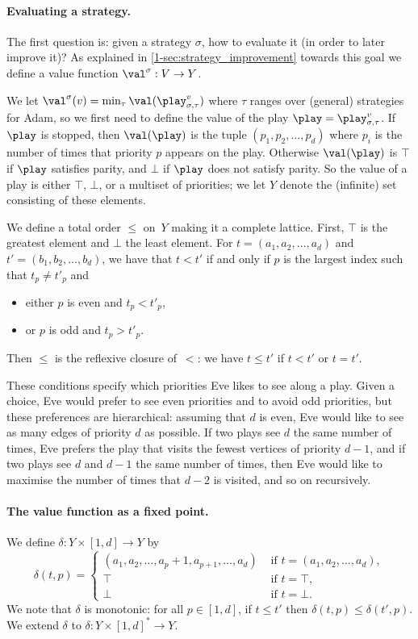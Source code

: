 \paragraph{\bf Evaluating a strategy.}
The first question is: given a strategy $\sigma$, how to evaluate it (in order to later improve it)?
As explained in \cref{1-sec:strategy_improvement} towards this goal we define a value function $\val^{\sigma} : V \to Y$.

We let $\val^{\sigma}(v) = \min_\tau \val(\play_{\sigma,\tau}^v)$ where $\tau$ ranges over (general) strategies for Adam, so we first need to define the value of the play $\play = \play_{\sigma,\tau}^v$.
If $\play$ is stopped, then $\val(\play)$ is the tuple $(p_1, p_2, \dots, p_d)$ where $p_i$ is the number of times that priority $p$ appears on the play.
Otherwise $\val(\play)$ is $\top$ if $\play$ satisfies parity, and $\bot$ if $\play$ does not satisfy parity.
So the value of a play is either $\top$, $\bot$, or a multiset of priorities;
we let $Y$ denote the (infinite) set consisting of these elements.

We define a total order $\le$ on~$Y$ making it a complete lattice.
First, $\top$ is the greatest element and $\bot$ the least element.
For $t = (a_1, a_2, \dots, a_d)$ and $t' = (b_1, b_2, \dots, b_d)$,
we have that $t < t'$ if and only if $p$ is the largest index such that $t_p \ne t'_p$ and 
\begin{itemize}
	\item either $p$ is even and $t_p < t'_p$,
	\item or $p$ is odd and $t_p > t'_p$.
\end{itemize}
Then $\le$ is the reflexive closure of~$<$: we have $t \le t'$ if $t < t'$ or $t = t'$.

These conditions specify which priorities Eve likes to see along a play.
Given a choice, Eve would prefer to see even priorities and to avoid odd priorities, but these preferences are hierarchical: 
assuming that $d$ is even, Eve would like to see as many edges of priority $d$ as possible. 
If two plays see $d$ the same number of times, Eve prefers the play that visits the fewest vertices of
priority $d-1$, and if two plays see $d$ and $d-1$ the same number of times,
then Eve would like to maximise the number of times that $d-2$ is visited, and so on recursively.

\paragraph{\bf The value function as a fixed point.}
We define $\delta : Y \times [1,d] \to Y$ by 
\[
\delta(t,p) = 
\begin{cases}
(a_1, a_2, \dots, a_p + 1, a_{p+1}, \dots, a_d) & \text{ if } t = (a_1, a_2, \dots, a_d), \\
\top & \text{ if } t = \top, \\
\bot & \text{ if } t = \bot.
\end{cases}
\]
We note that $\delta$ is monotonic: for all $p \in [1,d]$,
if $t \le t'$ then $\delta(t,p) \le \delta(t',p)$. 
We extend $\delta$ to $\delta : Y \times [1,d]^* \to Y$.

